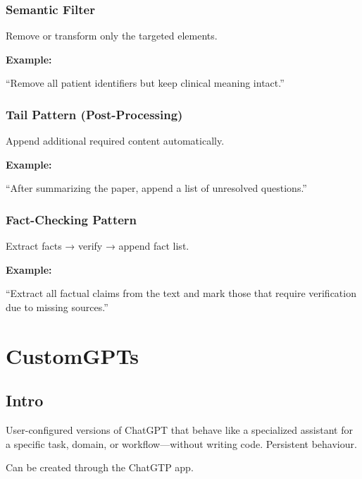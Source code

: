 \documentclass[
  letterpaper,
  DIV=11,
  numbers=noendperiod]{scrreprt}
\begin{document}
\subsection{Semantic Filter}\label{semantic-filter-1}

Remove or transform only the targeted elements.

\textbf{Example:}

``Remove all patient identifiers but keep clinical meaning intact.''

\subsection{Tail Pattern
(Post-Processing)}\label{tail-pattern-post-processing}

Append additional required content automatically.

\textbf{Example:}

``After summarizing the paper, append a list of unresolved questions.''

\subsection{Fact-Checking Pattern}\label{fact-checking-pattern-1}

Extract facts → verify → append fact list.

\textbf{Example:}

``Extract all factual claims from the text and mark those that require
verification due to missing sources.''


\chapter{CustomGPTs}\label{customgpts}

\section{Intro}\label{intro}

User-configured versions of ChatGPT that behave like a specialized
assistant for a specific task, domain, or workflow---without writing
code. Persistent behaviour.

Can be created through the ChatGTP app.
\end{document}
